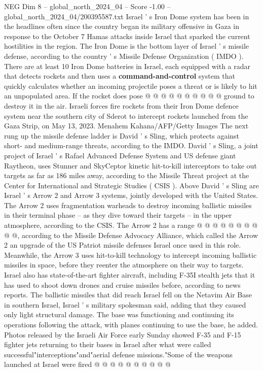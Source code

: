 \begin{textsample}{NEG Dim 8 – global\_north\_2024\_04 – Score -1.00 – global\_north\_2024\_04/200395587.txt}
Israel ' s Iron Dome system has been in the headlines often since the country began its military offensive in Gaza in response to the October 7 Hamas attacks inside Israel that sparked the current hostilities in the region.
The Iron Dome is the bottom layer of Israel ' s missile defense, according to the country ' s Missile Defense Organization ( IMDO ).
There are at least 10 Iron Dome batteries in Israel, each equipped with a radar that detects rockets and then uses a \textbf{command-and-control} system that quickly calculates whether an incoming projectile poses a threat or is likely to hit an unpopulated area.
If the rocket does pose @ @ @ @ @ @ @ @ @ @ ground to destroy it in the air.
Israeli forces fire rockets from their Iron Dome defence system near the southern city of Sderot to intercept rockets launched from the Gaza Strip, on May 13, 2023.
Menahem Kahana/AFP/Getty Images The next rung up the missile defense ladder is David ' s Sling, which protects against short- and medium-range threats, according to the IMDO.
David ' s Sling, a joint project of Israel ' s Rafael Advanced Defense System and US defense giant Raytheon, uses Stunner and SkyCeptor kinetic hit-to-kill interceptors to take out targets as far as 186 miles away, according to the Missile Threat project at the Center for International and Strategic Studies ( CSIS ).
Above David ' s Sling are Israel ' s Arrow 2 and Arrow 3 systems, jointly developed with the United States.
The Arrow 2 uses fragmentation warheads to destroy incoming ballistic missiles in their terminal phase -- as they dive toward their targets -- in the upper atmosphere, according to the CSIS.
The Arrow 2 has a range @ @ @ @ @ @ @ @ @ @, according to the Missile Defense Advocacy Alliance, which called the Arrow 2 an upgrade of the US Patriot missile defenses Israel once used in this role.
Meanwhile, the Arrow 3 uses hit-to-kill technology to intercept incoming ballistic missiles in space, before they reenter the atmosphere on their way to targets.
Israel also has state-of-the-art fighter aircraft, including F-35I stealth jets that it has used to shoot down drones and cruise missiles before, according to news reports.
The ballistic missiles that did reach Israel fell on the Netavim Air Base in southern Israel, Israel ' s military spokesman said, adding that they caused only light structural damage.
The base was functioning and continuing its operations following the attack, with planes continuing to use the base, he added.
Photos released by the Israeli Air Force early Sunday showed F-35 and F-15 fighter jets returning to their bases in Israel after what were called successful"interceptions"and"aerial defense missions."Some of the weapons launched at Israel were fired @ @ @ @ @ @ @ @ @ @

\end{textsample}
